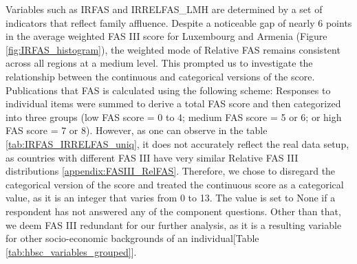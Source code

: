 \documentclass[main.tex]{subfiles}
\begin{document}
Variables such as IRFAS and IRRELFAS\_LMH are determined by a set of indicators that reflect family affluence. Despite a noticeable gap of nearly 6 points in the average weighted FAS III score for Luxembourg and Armenia (Figure \ref{fig:IRFAS_histogram}), the weighted mode of Relative FAS remains consistent across all regions at a medium level. This prompted us to investigate the relationship between the continuous and categorical versions of the score. Publications\cite{McCormack2011} that FAS is calculated using the following scheme: Responses to individual items were summed to derive a total FAS score and then categorized into three groups (low FAS score = 0 to 4; medium FAS score = 5 or 6; or high FAS score = 7 or 8). However, as one can observe in the table  \ref{tab:IRFAS_IRRELFAS_uniq}, it does not accurately reflect the real data setup, as countries with different FAS III have very similar Relative FAS III distributions \ref{appendix:FASIII_RelFAS}. Therefore, we chose to disregard the categorical version of the score and treated the continuous score as a categorical value, as it is an integer that varies from 0 to 13. The value is set to None if a respondent has not answered any of the component questions. Other than that, we deem FAS III redundant for our further analysis, as it is a resulting variable for other socio-economic backgrounds of an individual[Table \ref{tab:hbsc_variables_grouped}].

\end{document}
